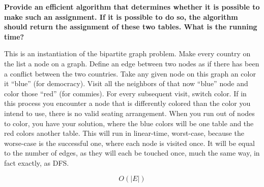 \documentclass[11pt]{article}
\begin{document}
\noindent \textbf{Provide an efficient algorithm that determines whether it is
possible to make such an assignment. If it is possible to do so, the
algorithm should return the assignment of these two tables. What is
the running time?}

This is an instantiation of the bipartite graph problem. Make every country
on the list a node on a graph. Define an edge between two nodes as if there
has been a conflict between the two countries. Take any given node on this
graph an color it ``blue'' (for democracy). 
Visit all the neighbors of that now ``blue'' node and color those ``red''
(for commies). For every subsequent visit, switch color. If in this 
process you encounter a node that is differently colored than the color
you intend to use, there is no valid seating arrangement. When you run out
of nodes to color, you have your solution, where the blue colors will be one
table and the red colors another table. This will run in linear-time, worst-case,
because the worse-case is the successful one, where each node is visited once.
It will be equal to the number of edges, as they will each be touched once,
much the same way, in fact exactly, as DFS.

$$O(|E|)$$
\end{document}
